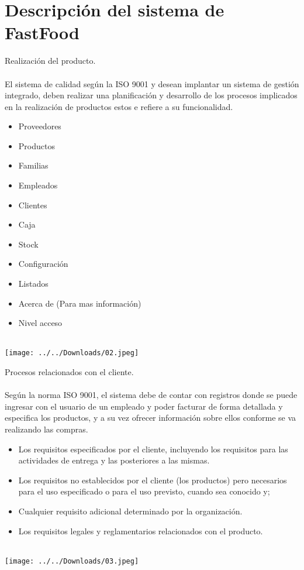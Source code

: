 \documentclass[12pt,a4paper]{article}
\begin{document}
\section{Descripción del sistema de FastFood}
Realización del producto.\\\\
El sistema de calidad según la ISO 9001 y desean implantar un sistema de gestión integrado, deben realizar una planificación y desarrollo de los procesos implicados en la realización de productos estos e refiere a su funcionalidad.
\begin{itemize}
\item Proveedores
\item Productos
\item Familias
\item Empleados
\item Clientes
\item Caja
\item Stock
\item Configuración
\item Listados
\item Acerca de (Para mas información)
\item Nivel acceso\\\\
\end{itemize}
\begin{center}
\texttt{[image: ../../Downloads/02.jpeg]} 
\end{center}

Procesos relacionados con el cliente.\\\\
Según la norma ISO 9001, el sistema debe de contar con registros donde se puede ingresar con el usuario de un empleado y poder facturar de forma detallada y especifica los productos, y a su vez ofrecer información sobre ellos conforme se va realizando las compras.
\begin{itemize}
\item Los requisitos especificados por el cliente, incluyendo los requisitos para las actividades de entrega y las posteriores a las mismas.
\item Los requisitos no establecidos por el cliente (los productos) pero necesarios para el uso especificado o para el uso previsto, cuando sea conocido y;
\item Cualquier requisito adicional determinado por la organización.
\item Los requisitos legales y reglamentarios relacionados con el producto.\\\\
\end{itemize}
\begin{center}
\texttt{[image: ../../Downloads/03.jpeg]}  
\end{center}
\end{document}

